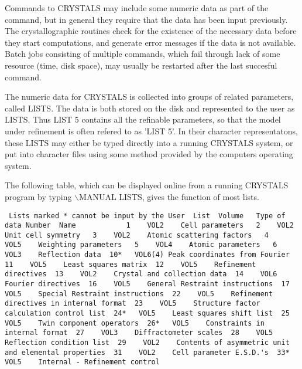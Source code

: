 \documentclass[10pt,a4paper]{report}
\begin{document}
Commands to CRYSTALS may include some numeric data as part of the command, but in general they require that the data has been input previously. The crystallographic routines check for the existence of the necessary data before they start computations, and generate error messages if the data is not available. Batch jobs  consisting of multiple commands, which fail  through lack of some resource (time, disk space),  may usually be  restarted after the last succesful command. 

The numeric data for CRYSTALS is collected into groups of related  parameters, called LISTS. The data is both stored on the disk and represented to the user as LISTS. Thus LIST 5 contains all the refinable parameters, so that the model under  refinement is often refered to as 'LIST 5'. In their character representatons, these LISTS may either be typed directly into a running CRYSTALS system, or put into character files using some method provided by the computers operating system. 

The following table, which can be displayed online from a running CRYSTALS program by typing $\backslash$MANUAL LISTS, gives the function of most lists.\small\begin{verbatim} Lists marked * cannot be input by the User  List  Volume   Type of data Number  Name            1    VOL2    Cell parameters   2    VOL2    Unit cell symmetry   3    VOL2    Atomic scattering factors   4    VOL5    Weighting parameters   5    VOL4    Atomic parameters   6    VOL3    Reflection data  10*   VOL6(4) Peak coordinates from Fourier  11    VOL5    Least squares matrix  12    VOL5    Refinement directives  13    VOL2    Crystal and collection data  14    VOL6    Fourier directives  16    VOL5    General Restraint instructions  17    VOL5    Special Restraint instructions  22    VOL5    Refinement directives in internal format  23    VOL5    Structure factor calculation control list  24*   VOL5    Least squares shift list  25    VOL5    Twin component operators  26*   VOL5    Constraints in internal format  27    VOL3    Diffractometer scales  28    VOL5    Reflection condition list  29    VOL2    Contents of asymmetric unit                 and elemental properties  31    VOL2    Cell parameter E.S.D.'s  33*   VOL5    Internal - Refinement control\end{verbatim}\normalsize
\end{document}
